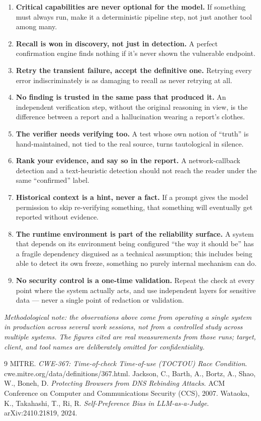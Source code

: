\documentclass[10pt]{article}
\begin{document}
\begin{enumerate}
\item \textbf{Critical capabilities are never optional for the model.} If something must always run, make it a deterministic pipeline step, not just another tool among many.
\item \textbf{Recall is won in discovery, not just in detection.} A perfect confirmation engine finds nothing if it's never shown the vulnerable endpoint.
\item \textbf{Retry the transient failure, accept the definitive one.} Retrying every error indiscriminately is as damaging to recall as never retrying at all.
\item \textbf{No finding is trusted in the same pass that produced it.} An independent verification step, without the original reasoning in view, is the difference between a report and a hallucination wearing a report's clothes.
\item \textbf{The verifier needs verifying too.} A test whose own notion of ``truth'' is hand-maintained, not tied to the real source, turns tautological in silence.
\item \textbf{Rank your evidence, and say so in the report.} A network-callback detection and a text-heuristic detection should not reach the reader under the same ``confirmed'' label.
\item \textbf{Historical context is a hint, never a fact.} If a prompt gives the model permission to skip re-verifying something, that something will eventually get reported without evidence.
\item \textbf{The runtime environment is part of the reliability surface.} A system that depends on its environment being configured ``the way it should be'' has a fragile dependency disguised as a technical assumption; this includes being able to detect its own freeze, something no purely internal mechanism can do.
\item \textbf{No security control is a one-time validation.} Repeat the check at every point where the system actually acts, and use independent layers for sensitive data --- never a single point of redaction or validation.
\end{enumerate}

\vspace{0.6em}
{\small\itshape Methodological note: the observations above come from operating a single system in production across several work sessions, not from a controlled study across multiple systems. The figures cited are real measurements from those runs; target, client, and tool names are deliberately omitted for confidentiality.}

\begin{thebibliography}{9}
 MITRE. \emph{CWE-367: Time-of-check Time-of-use (TOCTOU) Race Condition}. cwe.mitre.org/data/definitions/367.html.
 Jackson, C., Barth, A., Bortz, A., Shao, W., Boneh, D. \emph{Protecting Browsers from DNS Rebinding Attacks}. ACM Conference on Computer and Communications Security (CCS), 2007.
 Wataoka, K., Takahashi, T., Ri, R. \emph{Self-Preference Bias in LLM-as-a-Judge}. arXiv:2410.21819, 2024.
\end{thebibliography}
\end{document}
